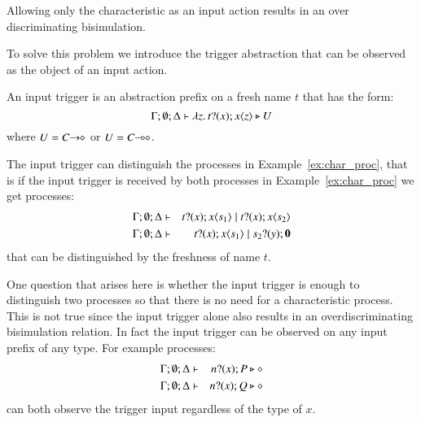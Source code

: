 Allowing only the characteristic as an input action
results in an over discriminating bisimulation.

To solve this problem we introduce the trigger abstraction
that can be observed as the object of an input action.

An input trigger is an abstraction prefix on a fresh name $t$
that has the form:
\[
	\Gamma; \emptyset; \Delta \vdash \lambda z.\,t ? (x) ; x\langle z \rangle \triangleright U
\]
where $U = C\!\! \rightarrow\!\! \diamond$ or $U = C\!\! \multimap\!\! \diamond$.

The input trigger can distinguish the processes in Example~\ref{ex:char_proc},
that is if the input trigger is received by both processes in Example~\ref{ex:char_proc}
we get processes:
%
\begin{eqnarray*}
	\Gamma; \emptyset; \Delta &\vdash& t ? (x) ; x\langle s_1 \rangle \;|\; t ? (x) ; x\langle s_2 \rangle
	\\
	\Gamma; \emptyset; \Delta &\vdash& t ? (x) ; x\langle s_1 \rangle \;|\; s_2 ? (y) ; \mathbf{0}
\end{eqnarray*}
\noi that can be distinguished by the freshness of name $t$.

One question that arises here is whether the input trigger is enough
to distinguish two processes so that there is no need for a
characteristic process. This is not true since the input trigger
alone also results in an overdiscriminating bisimulation relation.
In fact the input trigger can be observed on any input prefix
of any type. For example processes:
%
\begin{eqnarray*}
	\Gamma; \emptyset; \Delta &\vdash& n ? (x) ; P \triangleright \diamond
	\\
	\Gamma; \emptyset; \Delta &\vdash& n ? (x) ; Q \triangleright \diamond
\end{eqnarray*}
%
\noi can both observe the trigger input regardless of the type of $x$.

